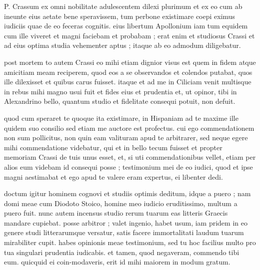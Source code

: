 


 P. Crassum ex omni nobilitate adulescentem dilexi plurimum et ex eo cum ab ineunte eius aetate bene speravissem, tum perbone existimare coepi eximus iudiciis quae de eo feceras cognitis. eius libertum Apollonium iam tum equidem cum ille viveret et magni faciebam et probabam ; erat enim et studiosus Crassi et ad eius optima studia vehementer aptus ; itaque ab eo admodum diligebatur.

 post mortem to autem Crassi eo mihi etiam dignior visus est quem in fidem atque amicitiam meam reciperem, quod eos a se observandos et colendos putabat, quos ille dilexisset et quibus carus fuisset. itaque et ad me in Ciliciam venit multisque in rebus mihi magno usui fuit et fides eius et prudentia et, ut opinor, tibi in Alexandrino bello, quantum studio et fidelitate consequi potuit, non defuit.

 quod cum speraret te quoque ita existimare, in Hispaniam ad te maxime ille quidem suo consilio sed etiam me auctore est profectus. cui ego commendationem non sum pollicitus, non quin eam valituram apud te arbitrarer, sed neque egere mihi commendatione videbatur, qui et in bello tecum fuisset et propter memoriam Crassi de tuis unus esset, et, si uti commendationibus vellet, etiam per alios eum videbam id consequi posse ; testimonium mei de eo iudici, quod et ipse magni aestimabat et ego apud te valere eram expertus, ei libenter dedi.

 doctum igitur hominem cognovi et studiis optimis deditum, idque a puero ; nam domi meae cum Diodoto Stoico, homine meo iudicio eruditissimo, multum a puero fuit. nunc autem incensus studio rerum tuarum eas litteris Graecis mandare cupiebat. posse arbitror ; valet ingenio, habet usum, iam pridem in eo genere studi litterarumque versatur, satis facere immortalitati laudum tuarum mirabiliter cupit. habes opinionis meae testimonium, sed tu hoc facilius multo pro tua singulari prudentia iudicabis. et tamen, quod negaveram, commendo tibi eum. quicquid ei coin-modaveris, erit id mihi maiorem in modum gratum.
